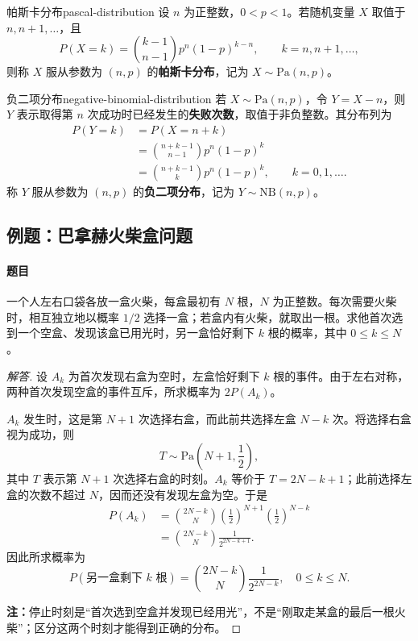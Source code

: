 \begin{mydefinition}{帕斯卡分布}{pascal-distribution}
设 $n$ 为正整数，$0<p<1$。若随机变量 $X$ 取值于 $n,n+1,\ldots$，且
\[
P(X=k)=\binom{k-1}{n-1}p^n(1-p)^{k-n},
\qquad k=n,n+1,\ldots,
\]
则称 $X$ 服从参数为 $(n,p)$ 的\textbf{帕斯卡分布}，记为 $X\sim\mathrm{Pa}(n,p)$。
\end{mydefinition}

\begin{mydefinition}{负二项分布}{negative-binomial-distribution}
若 $X\sim\mathrm{Pa}(n,p)$，令 $Y=X-n$，则 $Y$ 表示取得第 $n$ 次成功时已经发生的\textbf{失败次数}，取值于非负整数。其分布列为
\[
\begin{aligned}
P(Y=k)&=P(X=n+k)\\
&=\binom{n+k-1}{n-1}p^n(1-p)^k\\
&=\binom{n+k-1}{k}p^n(1-p)^k,\qquad k=0,1,\ldots.
\end{aligned}
\]
称 $Y$ 服从参数为 $(n,p)$ 的\textbf{负二项分布}，记为 $Y\sim\mathrm{NB}(n,p)$。
\end{mydefinition}

\subsection{例题：巴拿赫火柴盒问题}\label{note:c2:e9}
\paragraph{题目}
一个人左右口袋各放一盒火柴，每盒最初有 $N$ 根，$N$ 为正整数。每次需要火柴时，相互独立地以概率 $1/2$ 选择一盒；若盒内有火柴，就取出一根。求他首次选到一个空盒、发现该盒已用光时，另一盒恰好剩下 $k$ 根的概率，其中 $0\leq k\leq N$。

\begin{proof}[解答]
设 $A_k$ 为首次发现右盒为空时，左盒恰好剩下 $k$ 根的事件。由于左右对称，两种首次发现空盒的事件互斥，所求概率为 $2P(A_k)$。

$A_k$ 发生时，这是第 $N+1$ 次选择右盒，而此前共选择左盒 $N-k$ 次。将选择右盒视为成功，则
\[
T\sim\mathrm{Pa}\left(N+1,\frac12\right),
\]
其中 $T$ 表示第 $N+1$ 次选择右盒的时刻。$A_k$ 等价于 $T=2N-k+1$；此前选择左盒的次数不超过 $N$，因而还没有发现左盒为空。于是
\[
\begin{aligned}
P(A_k)
&=\binom{2N-k}{N}
\left(\frac12\right)^{N+1}
\left(\frac12\right)^{N-k}\\
&=\binom{2N-k}{N}\frac1{2^{2N-k+1}}.
\end{aligned}
\]
因此所求概率为
\[
\boxed{\,P(\text{另一盒剩下 }k\text{ 根})
=\binom{2N-k}{N}\frac1{2^{2N-k}},\quad 0\leq k\leq N.\,}
\]

\textbf{注：}\quad 停止时刻是“首次选到空盒并发现已经用光”，不是“刚取走某盒的最后一根火柴”；区分这两个时刻才能得到正确的分布。
\end{proof}

